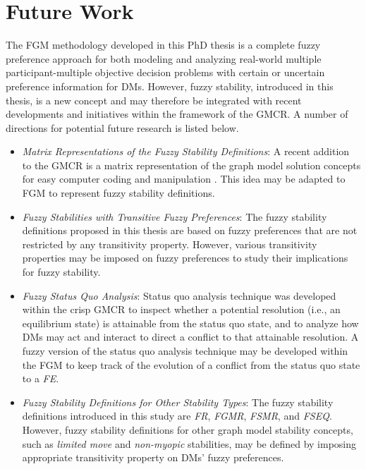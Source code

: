 \section{Future Work}\label{sec-fw}

The FGM methodology developed in this PhD thesis is a complete fuzzy preference approach for both modeling and analyzing real-world multiple participant-multiple objective decision problems with certain or uncertain preference information for DMs. However, fuzzy stability, introduced in this thesis, is a new concept and may therefore be integrated with recent developments and initiatives within the framework of the GMCR. A number of directions for potential future research is listed below.

\begin{itemize}
    \item \emph{Matrix Representations of the Fuzzy Stability Definitions}: A recent addition to the GMCR is a matrix representation of the graph model solution concepts for easy computer coding and manipulation \citep{Xu-et-al2009a, Xu-et-al2009b, Xu-et-al2011}. This idea may be adapted to FGM to represent fuzzy stability definitions.
  \item \emph{Fuzzy Stabilities with Transitive Fuzzy Preferences}: The fuzzy stability definitions proposed in this thesis are based on fuzzy preferences that are not restricted by any transitivity property. However, various transitivity properties may be imposed on fuzzy preferences to study their implications for fuzzy stability.
  \item \emph{Fuzzy Status Quo Analysis}: Status quo analysis technique \citep{Li-et-al2004b, Li-et-al2005a, Li-et-al2005b} was developed within the crisp GMCR to inspect whether a potential resolution (i.e., an equilibrium state) is attainable from the status quo state, and to analyze how DMs may act and interact to direct a conflict to that attainable resolution. A fuzzy version of the status quo analysis technique may be developed within the FGM to keep track of the evolution of a conflict from the status quo state to a \emph{FE}.
  \item \emph{Fuzzy Stability Definitions for Other Stability Types}: The fuzzy stability definitions introduced in this study are \emph{FR}, \emph{FGMR}, \emph{FSMR}, and \emph{FSEQ}. However, fuzzy stability definitions for other graph model stability concepts, such as \emph{limited move} and \emph{non-myopic} stabilities, may be defined by imposing appropriate transitivity property on DMs' fuzzy preferences.

\end{itemize}
